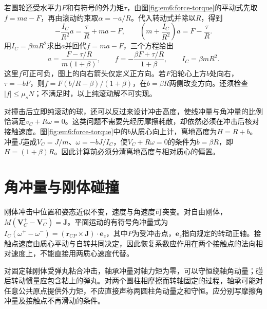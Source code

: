 若圆轮还受水平力$F$和有符号的外力矩$\tau$，由图\ref{fig:em6:force-torque}的平动式先取$f=ma-F$，再由滚动约束取$\alpha=-a/R$。代入转动式并除以$R$，得到
\[
 -\frac{I_C}{R^2}a=\frac\tau R+ma-F,
 \qquad
 \left(m+\frac{I_C}{R^2}\right)a=F-\frac\tau R.
\]
用$I_C=\beta mR^2$求出$a$并回代$f=ma-F$，三个方程给出
\[
 a=\frac{F-\tau/R}{m(1+\beta)},\qquad
 f=-\frac{\beta F+\tau/R}{1+\beta},\qquad I_C=\beta mR^2.
\]
这里$f$可正可负，图上的向右箭头仅定义正方向。若$F$沿轮心上方$b$处向右，$\tau=-bF$，则$f=F(b/R-\beta)/(1+\beta)$，在$b=\beta R$两侧改变方向。还须检查$|f|\le\mu_sN$；不满足时，以上纯滚动解不可实现。


对撞击后立即纯滚动的球，还可以反过来设计冲击高度，使线冲量与角冲量的比例恰满足$v_C+R\omega=0$。这类问题不需要先经历摩擦耗散，却依然必须在冲击后核对接触速度。图\ref{fig:em6:force-torque}中的$b$从质心向上计，离地高度为$H=R+b$。冲量$J$造成$V_C=J/m$、$\omega=-bJ/I_C$，使$V_C+R\omega=0$的条件为$b=\beta R$，即$H=(1+\beta)R$。因此计算前必须分清离地高度与相对质心的偏置。

\section{角冲量与刚体碰撞}

刚体冲击中位置和姿态近似不变，速度与角速度可突变。对自由刚体，$M(\bm V_C^+-\bm V_C^-)=\bm J$。平面运动的有符号角冲量式为$I_C(\omega^+-\omega^-)=(\bm r_{CP}\times\bm J)\cdot\bm e_z$，其中$P$为受冲击点，$\bm e_z$指向规定的转动正轴。接触点速度由质心平动与自转共同决定，因此恢复系数应作用在两个接触点的法向相对速度上，不能直接用两质心速度代替。

对固定轴刚体受弹丸粘合冲击，轴承冲量对轴力矩为零，可以守恒绕轴角动量；碰后转动惯量应包含粘上的弹丸。对两个圆柱相摩擦而转轴固定的过程，轴承可能对任意公共原点提供外力矩，不应直接声称两圆柱角动量之和守恒。应分别写摩擦角冲量及接触点不再滑动的条件。

